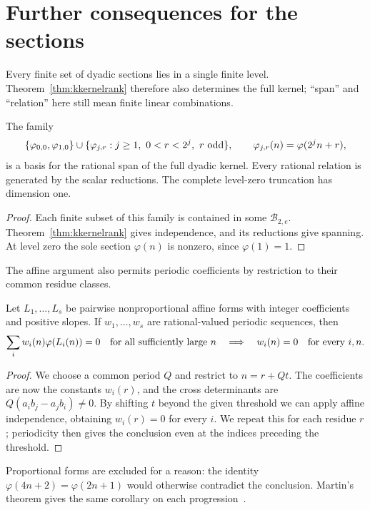 \documentclass[11pt]{article}
\begin{document}
\appendix
\section{Further consequences for the sections}\label{app:sources}
Every finite set of dyadic sections lies in a single finite level.
Theorem~\ref{thm:kkernelrank} therefore also determines the full kernel;
``span'' and ``relation'' here still mean finite linear combinations.

\begin{corollary}\label{res:basis}
The family
\[
 \{\varphi_{0,0},\varphi_{1,0}\}
 \cup\{\varphi_{j,r}:j\ge1,\ 0<r<2^j,\ r\text{ odd}\},
 \qquad \varphi_{j,r}(n)=\varphi(2^jn+r),
\]
is a basis for the rational span of the full dyadic kernel. Every rational
relation is generated by the scalar reductions. The complete level-zero
truncation has dimension one.
\end{corollary}
\begin{proof}
Each finite subset of this family is contained in some
$\mathcal B_{2,e}$. Theorem~\ref{thm:kkernelrank} gives independence,
and its reductions give spanning. At level zero the sole section
$\varphi(n)$ is nonzero, since $\varphi(1)=1$.
\end{proof}

The affine argument also permits periodic coefficients by restriction
to their common residue classes.
\begin{corollary}\label{cor:periodic-freezing}
Let $L_1,\ldots,L_s$ be pairwise nonproportional affine forms with integer
coefficients and positive slopes. If $w_1,\ldots,w_s$ are rational-valued
periodic sequences, then
\[
 \sum_i w_i(n)\varphi(L_i(n))=0\quad\text{for all sufficiently large }n
 \quad\Longrightarrow\quad w_i(n)=0\quad\text{for every }i,n.
\]
\end{corollary}
\begin{proof}
We choose a common period $Q$ and restrict to $n=r+Qt$. The
coefficients are now the constants $w_i(r)$, and the cross
determinants are $Q(a_i b_j-a_j b_i)\ne0$. By shifting $t$ beyond
the given threshold we can apply affine independence, obtaining
$w_i(r)=0$ for every $i$. We repeat this for each residue $r$;
periodicity then gives the conclusion even at the indices preceding
the threshold.
\end{proof}
Proportional forms are excluded for a reason: the identity
$\varphi(4n+2)=\varphi(2n+1)$ would otherwise contradict the conclusion.
Martin's theorem gives the same corollary on each
progression~\cite[Thm.~1]{martin-phi-inequalities}.
\end{document}
